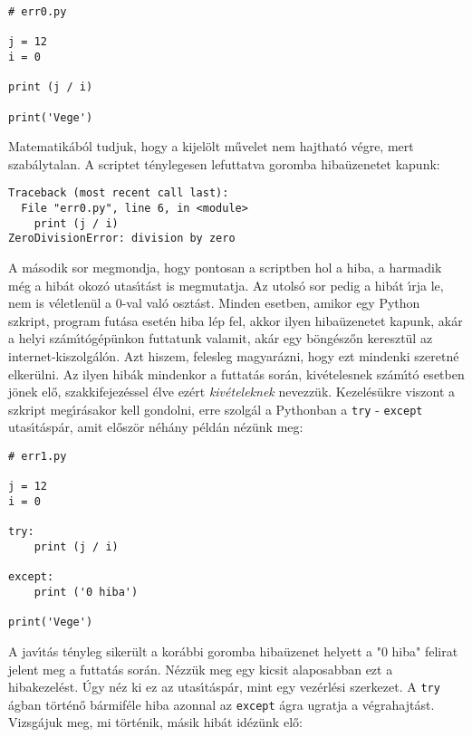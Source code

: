 \documentclass[12pt]{article}
\begin{document}
\begin{Verbatim}[fontsize=\small]
# err0.py

j = 12 
i = 0

print (j / i)

print('Vege')   
\end{Verbatim}

Matematik\'ab\'ol tudjuk, hogy a kijel\"olt m\H{u}velet nem hajthat\'o v\'egre, mert szab\'aly\-ta\-lan. A scriptet 
t\'enylegesen lefuttatva goromba hiba\"uzenetet kapunk:

\begin{Verbatim}[fontsize=\small]
Traceback (most recent call last):
  File "err0.py", line 6, in <module>
    print (j / i)
ZeroDivisionError: division by zero
\end{Verbatim}

A m\'asodik sor megmondja, hogy pontosan a scriptben hol a hiba, a harmadik m\'eg a hib\'at okoz\'o utas\'{\i}t\'ast 
is megmutatja. Az utols\'o sor pedig a hib\'at \'{\i}rja le, nem is v\'eletlen\"ul a $0$-val val\'o oszt\'ast. 
Minden esetben, amikor egy Python szkript, program fut\'asa eset\'en hiba l\'ep fel, akkor ilyen hiba\"uzenetet kapunk, 
ak\'ar a helyi sz\'am\'{\i}t\'og\'ep\"unkon futtatunk valamit, ak\'ar egy b\"ong\'esz\H{o}n kereszt\"ul az 
internet-kiszolg\'al\'on. Azt hiszem, felesleg magyar\'azni, hogy ezt mindenki szeretn\'e elker\"ulni. Az ilyen 
hib\'ak mindenkor a futtat\'as sor\'an, kiv\'etelesnek sz\'am\'{\i}t\'o esetben j\"onek el\H{o}, szakkifejez\'essel 
\'elve ez\'ert {\sl kiv\'eteleknek}  nevezz\"uk. Kezel\'es\"ukre viszont a szkript meg\'{\i}r\'asakor kell 
gondolni, erre 
szolg\'al a Pythonban a {\tt try} - {\tt except} utas\'{\i}t\'asp\'ar, amit el\H{o}sz\"or n\'eh\'any p\'eld\'an n\'ez\"unk 
meg:

\begin{Verbatim}[fontsize=\small]
# err1.py

j = 12 
i = 0

try:
    print (j / i)

except:
    print ('0 hiba')
    
print('Vege')
\end{Verbatim}

A jav\'{\i}t\'as t\'enyleg siker\"ult a kor\'abbi goromba hiba\"uzenet helyett a "0 hiba" felirat jelent meg a futtat\'as 
sor\'an. N\'ezz\"uk meg egy kicsit alaposabban ezt a hibakezel\'est. \'Ugy n\'ez ki ez az utas\'{\i}t\'asp\'ar, mint egy 
vez\'erl\'esi szerkezet. A {\tt try} \'agban t\"ort\'en\H{o} b\'armif\'ele hiba azonnal az {\tt except} \'agra ugratja 
a v\'egrahajt\'ast. Vizsg\'ajuk meg, mi t\"ort\'enik,  m\'asik hib\'at id\'ez\"unk el\H{o}:
\end{document}
